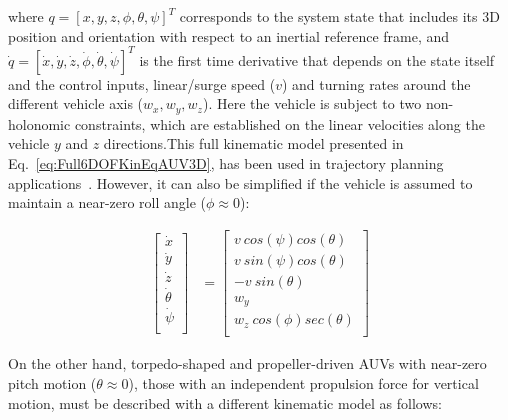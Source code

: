 where $q=\left[x, y, z, \phi, \theta, \psi\right]^T$ corresponds to the system
state that includes its \ac{3D} position and orientation with respect to an
inertial reference frame, and $\dot{q}=\left[\dot{x}, \dot{y}, \dot{z}, \dot{\phi},
\dot{\theta}, \dot{\psi}\right]^T$ is the first time derivative that depends on
the state itself and the control inputs, \ie linear/surge speed ($v$) and
turning rates around the different vehicle axis ($w_x, w_y, w_z$). Here the
vehicle is subject to two non-holonomic constraints, which are established
on the linear velocities along the vehicle $y$ and $z$ directions.This full
kinematic model presented in Eq.~\eqref{eq:Full6DOFKinEqAUV3D}, has been used in
trajectory planning applications~\cite{Qu2009}. However, it can also be
simplified if the vehicle is assumed to maintain a near-zero roll angle ($\phi
\approx 0$):

\begin{equation}
\label{eq:Full5DOFKinEqAUV3D}
\begin{split}
	\begin{bmatrix}
		\dot{x}\\
		\dot{y}\\
		\dot{z}\\
		\dot{\theta}\\
		\dot{\psi}\\
	\end{bmatrix} & = \begin{bmatrix}
		v\ cos\left(\psi\right)cos\left(\theta\right)\\
		v\ sin\left(\psi\right)cos\left(\theta\right)\\
		-v\ sin\left(\theta\right)\\
		w_y\\
		w_z\ cos\left(\phi\right)sec\left(\theta\right)\\
	\end{bmatrix}
\end{split}
\end{equation}

On the other hand, torpedo-shaped and propeller-driven \acp{AUV} with near-zero
pitch motion ($\theta \approx 0$), \ie those with an independent propulsion
force for vertical motion, must be described with a different kinematic model as
follows:

